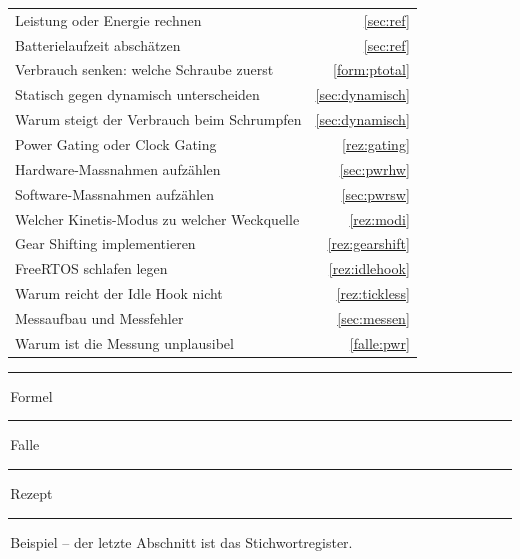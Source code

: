 
\begin{tcolorbox}[zfbox, colback=black!2, colframe=black!45,
  coltitle=white, colbacktitle=black!45, title={Wenn die Aufgabe lautet \dots}]
\begin{tabularx}{\linewidth}{@{}Xr@{}}
Leistung oder Energie rechnen & \ref{sec:ref} \\
Batterielaufzeit abschätzen & \ref{sec:ref} \\
Verbrauch senken: welche Schraube zuerst & \ref{form:ptotal} \\
Statisch gegen dynamisch unterscheiden & \ref{sec:dynamisch} \\
Warum steigt der Verbrauch beim Schrumpfen & \ref{sec:dynamisch} \\
Power Gating oder Clock Gating & \ref{rez:gating} \\
Hardware-Massnahmen aufzählen & \ref{sec:pwrhw} \\
Software-Massnahmen aufzählen & \ref{sec:pwrsw} \\
Welcher Kinetis-Modus zu welcher Weckquelle & \ref{rez:modi} \\
Gear Shifting implementieren & \ref{rez:gearshift} \\
FreeRTOS schlafen legen & \ref{rez:idlehook} \\
Warum reicht der Idle Hook nicht & \ref{rez:tickless} \\
Messaufbau und Messfehler & \ref{sec:messen} \\
Warum ist die Messung unplausibel & \ref{falle:pwr} \\
\end{tabularx}
\vspace{2pt}
\textcolor{accent}{\rule{7pt}{7pt}}\,Formel \;
\textcolor{red!65}{\rule{7pt}{7pt}}\,Falle \;
\textcolor{green!40!black}{\rule{7pt}{7pt}}\,Rezept \;
\textcolor{black!55}{\rule{7pt}{7pt}}\,Beispiel \;
-- der letzte Abschnitt ist das Stichwortregister.
\end{tcolorbox}
